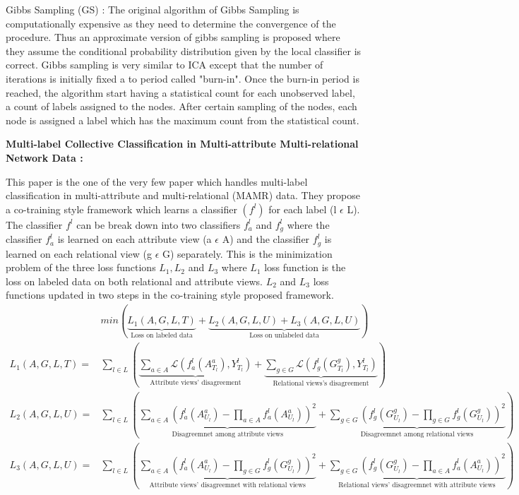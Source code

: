 Gibbs Sampling (GS) : The original algorithm of Gibbs Sampling is computationally expensive as they need to determine the convergence of the procedure. Thus an approximate version of gibbs sampling is proposed where they assume the conditional probability distribution given by the local classifier is correct. Gibbs sampling is very similar to ICA except that the number of iterations is initially fixed a to period called "burn-in". Once the burn-in period is reached, the algorithm start having a statistical count for each unobserved label, a count of labels assigned to the nodes. After certain sampling of the nodes, each node is assigned a label which has the maximum count from the statistical count.
\begin{flushleft}
\textbf{Multi-label Collective Classification in Multi-attribute Multi-relational Network Data\cite{priyesh} :}
\end{flushleft}

This paper is the one of the very few paper which handles multi-label classification in multi-attribute and multi-relational (MAMR) data. They propose a co-training style framework  which learns a classifier $(f^l)$ for each label (l $\epsilon$ L). The classifier $f^l$ can be break down into two classifiers $f^l_a$ and $f^l_g$ where the classifier $f^l_a$ is learned on each attribute view (a $\epsilon$ A) and the classifier $f^l_g$ is learned on each relational view (g $\epsilon$ G) separately. This is the minimization problem of the three loss functions $L_1 , L_2$ and $L_3$ where $L_1$ loss function is the loss on labeled data on both relational and attribute views. $L_2$ and $L_3$ loss functions updated in two steps in the co-training style proposed framework.
\begin{align*}
& min(\underbrace{L_1(A,G,L,T)}_{\text{Loss on labeled data}} + \underbrace{L_2(A,G,L,U) + L_3(A,G,L,U)}_{\text{Loss on unlabeled data}})\\
L_1(A,G,L,T) = & \sum_{l \in L}(\underbrace{\sum_{a \in A}\mathcal{L}(f_a^l(A_{T_l}^a),Y_{T_l}^l)}_{\text{Attribute views' disagreement}} + \underbrace{\sum_{g \in G}\mathcal{L}(f_g^l(G_{T_l}^g),Y_{T_l}^l)}_{\text{Relational views's disagreement}})\\
L_2(A,G,L,U) = & \sum_{l \in L}(\underbrace{\sum_{a \in A}(f_a^l(A_{U_l}^a) - \prod_{a \in A}f_a^l(A_{U_l}^a))^2}_{\text{Disagreemnet among attribute views}} + \underbrace{\sum_{g \in G}(f_g^l(G_{U_l}^g) - \prod_{g \in G}f_g^l(G_{U_l}^g))^2}_{\text{Disagreemnet among relational views}})\\
L_3(A,G,L,U) = & \sum_{l \in L}(\underbrace{\sum_{a \in A}(f_a^l(A_{U_l}^a) - \prod_{g \in G}f_g^l(G_{U_l}^g))^2}_{\text{Attribute views' disagreemnet with relational views}} + \underbrace{\sum_{g \in G}(f_g^l(G_{U_l}^g) - \prod_{a \in A}f_a^l(A_{U_l}^a))^2}_{\text{Relational views' disagreemnet with attribute views}})\\
\end{align*}
